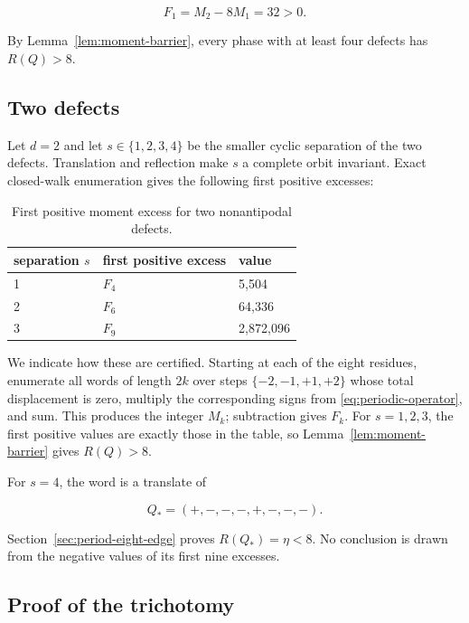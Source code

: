 \begin{equation}
F_{1}=M_{2}-8M_{1}=32>0.
\end{equation}

By Lemma~\ref{lem:moment-barrier}, every phase with at least four defects has \(R(Q)>8\).

\subsection{Two defects}\label{subsec:two-defects}

Let \(d=2\) and let \(s \in \{1,2,3,4\}\) be the smaller cyclic separation of the
two defects. Translation and reflection make \(s\) a complete orbit invariant.
Exact closed-walk enumeration gives the following first positive excesses:

\begin{table}[tbp]
\centering
\caption{First positive moment excess for two nonantipodal defects.}
\label{tab:two-defect-excesses}
\begingroup
\renewcommand{\arraystretch}{1.12}
\begin{tabular}{lll}
\toprule
separation \(s\) & first positive excess & value \\
\midrule
1 & \(F_{4}\) & 5,504 \\
2 & \(F_{6}\) & 64,336 \\
3 & \(F_{9}\) & 2,872,096 \\
\bottomrule
\end{tabular}
\endgroup
\end{table}

We indicate how these are certified. Starting at each of the eight residues,
enumerate all words of length \(2k\) over steps \(\{-2,-1,+1,+2\}\) whose total
displacement is zero, multiply the corresponding signs from \eqref{eq:periodic-operator}, and sum.
This produces the integer \(M_k\); subtraction gives \(F_k\). For \(s=1,2,3\), the
first positive values are exactly those in the table, so Lemma~\ref{lem:moment-barrier} gives
\(R(Q)>8\).

For \(s=4\), the word is a translate of

\begin{equation}
Q_*=(+,-,-,-,+,-,-,-).
\end{equation}

Section~\ref{sec:period-eight-edge} proves \(R(Q_*)=\eta<8\). No conclusion is drawn from the negative
values of its first nine excesses.

\subsection{Proof of the trichotomy}

